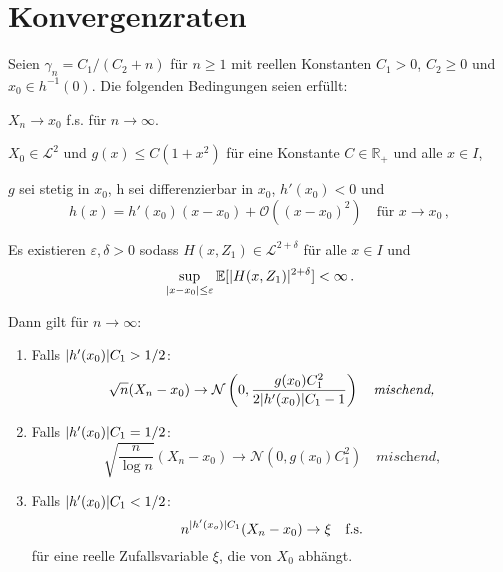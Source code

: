 \documentclass[ngerman,a4paper,11pt]{scrartcl}
\newcommand{\EE}{\mathbb{E}}
\newcommand{\RR}{\mathbb{R}}
\renewcommand{\ll}{\mathcal{L}}
\newcommand{\nn}{\mathcal{N}}
\newcommand{\expect}[1]{\EE[#1]}
\DeclarePairedDelimiter{\abs}{\lvert}{\rvert}		%
\begin{document}
\section{Konvergenzraten}
\begin{thm}
 \label{thm:haupt}
 Seien $\gamma_n=C_1/(C_2+n)$ für $n\geq 1$ mit reellen Konstanten $C_1>0$,
 $C_2\geq 0$ und $x_0\in h^{-1}(0)$. Die folgenden Bedingungen seien erfüllt:
 \begin{thmasslist}
 \item $X_n\to x_0$ f.s. für $n\to\infty$.
 \item $X_0\in\ll^2$ und $g(x)\leq C(1+x^2)$ für eine Konstante $C\in\RR_+$ und
   alle $x\in I$,\label{thm:haupt:b}
 \item $g$ sei stetig in $x_0$, h sei differenzierbar in $x_0$, $h'(x_0)<0$ und\label{thm:haupt:c}
   \begin{equation*}
    h(x) = h'(x_0)(x-x_0) + \mathcal{O}((x-x_0)^2)\quad\text{für $x\to x_0$}\,,
   \end{equation*}
 \item Es existieren $\varepsilon,\delta >0$ sodass $H(x,Z_1)\in\ll^{2+\delta}$ für
   alle $x\in I$ und\label{thm:haupt:d} 
   \begin{equation*}
    \sup_{\abs{x-x_0}\leq\varepsilon}\expect{\abs{H(x,Z_1)}^{2+\delta}}<\infty\,.
   \end{equation*}
 \end{thmasslist}
 Dann gilt für $n\to\infty$:
 \begin{enumerate}[label=(\roman*)]
 \item Falls $\abs{h'(x_0)}C_1>1/2$:\label{thm:haupt:i}
   \begin{equation*}
    \sqrt{n}(X_n-x_0)\to\nn\left( 0,\frac{g(x_0)C_1^2}{2\abs{h'(x_0)}C_1-1} \right)\quad\textit{mischend,}
   \end{equation*}
 \item Falls $\abs{h'(x_0)}C_1=1/2$:
   \begin{equation*}
    \sqrt{\frac{n}{\log n}}(X_n-x_0)\to\nn\left( 0,g(x_0)C_1^2 \right)\quad\textit{mischend,}
   \end{equation*}
 \item Falls $\abs{h'(x_0)}C_1<1/2$: 
   \begin{equation*}
     n^{\abs{h'(x_o)}C_1}(X_n-x_0)\to\xi \quad\text{f.s.}
   \end{equation*}
   für eine reelle Zufallsvariable $\xi$, die von $X_0$ abhängt.
 \end{enumerate}
\end{thm}
\end{document}
